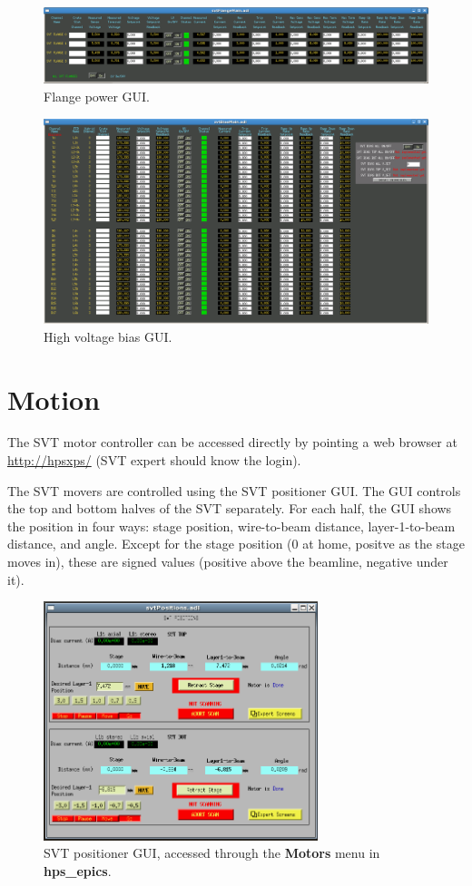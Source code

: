 \documentclass[12pt]{report}
\begin{document}
\begin{figure}[h!t]
\centering
\includegraphics[width=14cm]{svtFlange.png}
\caption{Flange power GUI. \label{fig:svtFlange}}
\end{figure}

\begin{figure}[h!]
\centering
\includegraphics[width=14cm]{svtBias.png}
\caption{High voltage bias GUI. \label{fig:svtBias}}
\end{figure}



\section{Motion}
The SVT motor controller can be accessed directly by pointing a web browser at \url{http://hpsxps/} (SVT expert should know the login).

The SVT movers are controlled using the SVT positioner GUI.
The GUI controls the top and bottom halves of the SVT separately.
For each half, the GUI shows the position in four ways: stage position, wire-to-beam distance, layer-1-to-beam distance, and angle. Except for the stage position (0 at home, positve as the stage moves in), these are signed values (positive above the beamline, negative under it).

\begin{figure}[h!t!]
\centering
\includegraphics[width=8cm]{svt_movers.png}
\caption{SVT positioner GUI, accessed through the \textbf{Motors} menu in \textbf{hps\_epics}.}
\label{mover}
\end{figure}
\end{document}
